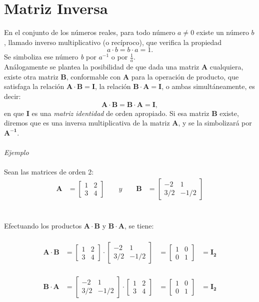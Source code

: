 \documentclass[a4paper,12pt]{report} %
\begin{document}
\section{Matriz Inversa}
En el conjunto de los números reales, para todo número \(\mathit{a}\neq 0\) existe un número \(\mathit{b}\), llamado inverso multiplicativo (o recíproco), que verifica la propiedad
\[
\mathit{a} \cdot \mathit{b} = \mathit{b} \cdot \mathit{a} = 1.
\]
Se simboliza ese número \textit{b} por \(\mathit{a^{-1}}\) o por \(\frac{1}{a}\).\\
Análogamente se plantea la posibilidad de que dada una matriz \textbf{A} cualquiera, existe otra matriz \textbf{B}, conformable con \textbf{A} para la operación de producto, que satisfaga la relación \(\mathbf{A \cdot B = I}\), la relación \(\mathbf{B \cdot A = I}\), o ambas simultáneamente, es decir:
\[
\mathbf{A \cdot B = B \cdot A = I},
\]
en que \textbf{I} es una \textit{matriz identidad} de orden apropiado. Si esa matriz \textbf{B} existe, diremos que es una inversa multiplicativa de la matriz \textbf{A}, y se la simbolizará por \(\mathbf{A^{-1}}\).
\\ \\
\textit{Ejemplo} \\ \\
Sean las matrices de orden 2:
\[
\begin{aligned}
\mathbf{A} &= \begin{bmatrix}
    1 & 2 \\
    3 & 4 
\end{bmatrix}
\qquad
y
\qquad
\mathbf{B} &= \begin{bmatrix}
    -2 & 1 \\
    3/2 & -1/2
\end{bmatrix}
\end{aligned}
\]\\ \\ 
Efectuando los productos \(\mathbf{A\cdot B}\) y \(\mathbf{B\cdot A}\), se tiene:\\ \\ 
\[
\begin{aligned}
\mathbf{A\cdot B} &= \begin{bmatrix}
    1 & 2 \\
    3 & 4 
\end{bmatrix}
\cdot
\begin{bmatrix}
    -2 & 1 \\
    3/2 & -1/2
\end{bmatrix}
&= \begin{bmatrix}
    1 & 0 \\
    0 & 1 
\end{bmatrix}
&= \mathbf{I_{2}}
\end{aligned}
\]\\
\[
\begin{aligned}
\mathbf{B\cdot A} &= \begin{bmatrix}
    -2 & 1 \\
    3/2 & -1/2
\end{bmatrix}
\cdot
\begin{bmatrix}
    1 & 2 \\
    3 & 4
\end{bmatrix}
&= \begin{bmatrix}
    1 & 0 \\
    0 & 1
\end{bmatrix}
&= \mathbf{I_{2}}
\end{aligned}
\]\\ \\
\end{document}
